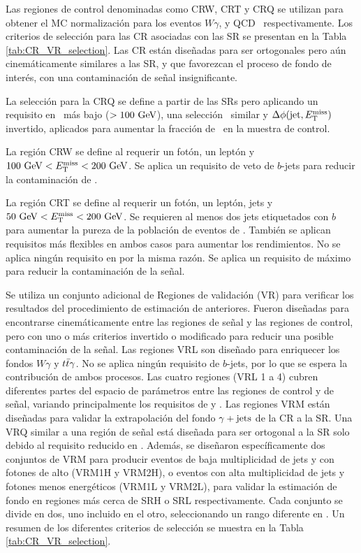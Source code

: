 Las regiones de control denominadas como CRW, CRT y CRQ se utilizan para obtener el MC
normalización para los eventos $ W \gamma $, \ttbarph y QCD \phj\, respectivamente.
Los criterios de selección para las CR asociadas con las SR se presentan en la Tabla \ref{tab:CR_VR_selection}. Las CR están diseñadas para ser ortogonales pero aún cinemáticamente similares a las SR, y que favorezcan el proceso de fondo de interés, con una contaminación de señal insignificante.

La selección para la CRQ se define a partir de las SRs pero
aplicando un requisito en \met\ más bajo ($> 100\ \gev $), una selección \HT\ similar
y $ \Delta\phi(\text{jet}, E_{\text{T}}^{\text{miss}})$ invertido, aplicados para aumentar la fracción de
\phj\ en la muestra de control.

La región CRW se define al requerir un fotón, un leptón y $ 100\ \text{GeV} <E_{\text{T}}^{\text{miss}} <200 \ \text{GeV} $. Se aplica un requisito de veto de $b$-jets para reducir la contaminación de \ttbarph.

La región CRT se define al requerir un fotón, un leptón, jets y $ 50 \ \text{GeV} <E_{\text{T}}^{\text{miss}} <200 \ \text{GeV} $. Se requieren al menos dos jets etiquetados con $b$ para aumentar la pureza de la población de eventos de \ttbarph. También se aplican requisitos más flexibles en ambos casos para aumentar los rendimientos. No se aplica ningún requisito en \rtf por la misma razón. Se aplica un requisito de \met máximo para reducir la contaminación de la señal.

Se utiliza un conjunto adicional de Regiones de validación (VR) para verificar
los resultados del procedimiento de estimación de anteriores. Fueron diseñadas para encontrarse
cinemáticamente entre las regiones de señal y las regiones de control, pero con uno o más criterios
invertido o modificado para reducir una posible contaminación de la señal. Las regiones VRL son
diseñado para enriquecer los fondos $ W \gamma $ y $ t\bar{t}\gamma $. No se aplica ningún requisito de $ b $-jets,
por lo que se espera la contribución de ambos procesos. Las cuatro regiones (VRL 1 a 4) cubren
diferentes partes del espacio de parámetros entre las regiones de control y de señal, variando principalmente los requisitos de \met y \HT.
Las regiones VRM están diseñadas para validar la extrapolación del fondo $ \gamma + \text{jets}$ de la CR a la SR.
Una VRQ similar a una región de señal está diseñada para ser ortogonal a la SR solo debido al requisito reducido en \met.
Además, se diseñaron específicamente dos conjuntos de VRM para producir eventos de baja multiplicidad de jets y con fotones de alto \pt (VRM1H y VRM2H), o eventos con alta multiplicidad de jets y fotones menos energéticos (VRM1L y VRM2L), para validar la estimación de fondo en regiones
más cerca de SRH o SRL respectivamente. Cada conjunto se divide en dos, uno incluido en el otro, seleccionando un rango diferente en \met.
Un resumen de los diferentes criterios de selección se muestra en la Tabla \ref{tab:CR_VR_selection}. 

